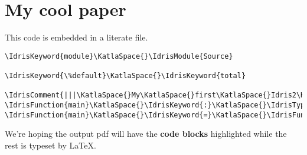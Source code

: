 \documentclass{article}
\begin{document}
\section{My cool paper}

This code is embedded in a literate file.

\begin{Verbatim}[commandchars=\\\{\}]
\IdrisKeyword{module}\KatlaSpace{}\IdrisModule{Source}

\IdrisKeyword{\%default}\KatlaSpace{}\IdrisKeyword{total}

\IdrisComment{|||\KatlaSpace{}My\KatlaSpace{}first\KatlaSpace{}Idris2\KatlaSpace{}function\KatlaSpace{}in\KatlaSpace{}tex}
\IdrisFunction{main}\KatlaSpace{}\IdrisKeyword{:}\KatlaSpace{}\IdrisType{IO}\KatlaSpace{}\IdrisType{()}
\IdrisFunction{main}\KatlaSpace{}\IdrisKeyword{=}\KatlaSpace{}\IdrisFunction{putStrLn}\KatlaSpace{}\IdrisData{"Hello\KatlaSpace{}from\KatlaSpace{}inside\KatlaSpace{}TeX"}
\end{Verbatim}

We're hoping the output pdf will have the \textbf{code blocks} highlighted
while the rest is typeset by \LaTeX{}.
\end{document}

